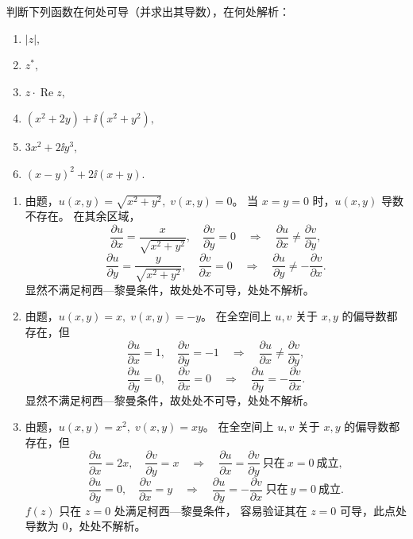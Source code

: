 \begin{question}
判断下列函数在何处可导（并求出其导数），在何处解析：
\begin{enumerate}
  \item \(|z|,\)
  \item \(z^*,\)
  \item \(z\cdot\operatorname{Re}z,\)
  \item \((x^2+2y)+\ii(x^2+y^2),\)
  \item \(3x^2+2\ii y^3,\)
  \item \((x-y)^2+2\ii(x+y).\)
\end{enumerate}
\begin{solution}
\begin{enumerate}
  \item 由题，\(u(x,y)=\sqrt{x^2+y^2},\;v(x,y)=0\)。
  当 \(x=y=0\) 时，\(u(x,y)\) 导数不存在。
  在其余区域，
  \[
  \frac{\partial u}{\partial x}=\frac{x}{\sqrt{x^2+y^2}},\quad
  \frac{\partial v}{\partial y}=0\quad\Longrightarrow\quad
  \frac{\partial u}{\partial x}\neq\frac{\partial v}{\partial y},
  \]
  \[
  \frac{\partial u}{\partial y}=\frac{y}{\sqrt{x^2+y^2}},\quad
  \frac{\partial v}{\partial x}=0\quad\Longrightarrow\quad
  \frac{\partial u}{\partial y}\neq-\frac{\partial v}{\partial x}.
  \]
  显然不满足柯西—黎曼条件，故处处不可导，处处不解析。

  \item 由题，\(u(x,y)=x,\;v(x,y)=-y\)。
  在全空间上 \(u,v\) 关于 \(x,y\) 的偏导数都存在，但
  \[
  \frac{\partial u}{\partial x}=1,\quad
  \frac{\partial v}{\partial y}=-1\quad\Longrightarrow\quad
  \frac{\partial u}{\partial x}\neq\frac{\partial v}{\partial y},
  \]
  \[
  \frac{\partial u}{\partial y}=0,\quad
  \frac{\partial v}{\partial x}=0\quad\Longrightarrow\quad
  \frac{\partial u}{\partial y}=-\frac{\partial v}{\partial x}.
  \]
  显然不满足柯西—黎曼条件，故处处不可导，处处不解析。

  \item 由题，\(u(x,y)=x^2,\;v(x,y)=xy\)。
  在全空间上 \(u,v\) 关于 \(x,y\) 的偏导数都存在，但
  \[
  \frac{\partial u}{\partial x}=2x,\quad
  \frac{\partial v}{\partial y}=x\quad\Longrightarrow\quad
  \frac{\partial u}{\partial x}=\frac{\partial v}{\partial y}\ \text{只在}\ x=0\ \text{成立},
  \]
  \[
  \frac{\partial u}{\partial y}=0,\quad
  \frac{\partial v}{\partial x}=y\quad\Longrightarrow\quad
  \frac{\partial u}{\partial y}=-\frac{\partial v}{\partial x}\ \text{只在}\ y=0\ \text{成立}.
  \]
  \(f(z)\) 只在 \(z=0\) 处满足柯西—黎曼条件，
  容易验证其在 \(z=0\) 可导，此点处导数为 \(0\)，处处不解析。


\end{enumerate}
\end{solution}
\end{question}
